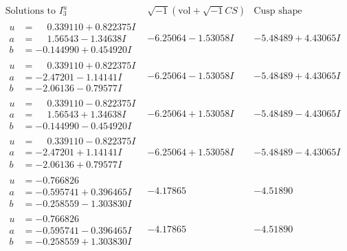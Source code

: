 \documentclass[1p]{elsarticle_modified}
\theoremstyle{definition}
\newcommand{\I}{\sqrt{-1}}
\begin{document}
$$\begin{array}{c|c|c}  
\text{Solutions to }I^u_{3}& \I (\text{vol} + \sqrt{-1}CS) & \text{Cusp shape}\\
 \hline 
\begin{aligned}
u &= \phantom{-}0.339110 + 0.822375 I \\
a &= \phantom{-}1.56543 - 1.34638 I \\
b &= -0.144990 + 0.454920 I\end{aligned}
 & -6.25064 - 1.53058 I & -5.48489 + 4.43065 I \\ \hline\begin{aligned}
u &= \phantom{-}0.339110 + 0.822375 I \\
a &= -2.47201 - 1.14141 I \\
b &= -2.06136 - 0.79577 I\end{aligned}
 & -6.25064 - 1.53058 I & -5.48489 + 4.43065 I \\ \hline\begin{aligned}
u &= \phantom{-}0.339110 - 0.822375 I \\
a &= \phantom{-}1.56543 + 1.34638 I \\
b &= -0.144990 - 0.454920 I\end{aligned}
 & -6.25064 + 1.53058 I & -5.48489 - 4.43065 I \\ \hline\begin{aligned}
u &= \phantom{-}0.339110 - 0.822375 I \\
a &= -2.47201 + 1.14141 I \\
b &= -2.06136 + 0.79577 I\end{aligned}
 & -6.25064 + 1.53058 I & -5.48489 - 4.43065 I \\ \hline\begin{aligned}
u &= -0.766826\phantom{ +0.000000I} \\
a &= -0.595741 + 0.396465 I \\
b &= -0.258559 - 1.303830 I\end{aligned}
 & -4.17865\phantom{ +0.000000I} & -4.51890\phantom{ +0.000000I} \\ \hline\begin{aligned}
u &= -0.766826\phantom{ +0.000000I} \\
a &= -0.595741 - 0.396465 I \\
b &= -0.258559 + 1.303830 I\end{aligned}
 & -4.17865\phantom{ +0.000000I} & -4.51890\phantom{ +0.000000I} \\ \hline\begin{aligned}

\end{aligned}
\end{array}$$
\end{document}
